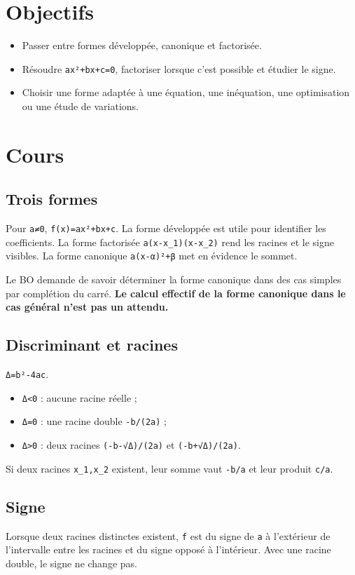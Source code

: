\section{Objectifs}
\begin{itemize}
\item Passer entre formes développée, canonique et factorisée.
\item Résoudre \texttt{ax²+bx+c=0}, factoriser lorsque c'est possible et étudier le signe.
\item Choisir une forme adaptée à une équation, une inéquation, une optimisation ou une étude de variations.
\end{itemize}

\section{Cours}
\subsection{Trois formes}
Pour \texttt{a≠0}, \texttt{f(x)=ax²+bx+c}. La forme développée est utile pour identifier les coefficients. La forme factorisée \texttt{a(x-x_1)(x-x_2)} rend les racines et le signe visibles. La forme canonique \texttt{a(x-α)²+β} met en évidence le sommet.

Le BO demande de savoir déterminer la forme canonique dans des cas simples par complétion du carré. \textbf{Le calcul effectif de la forme canonique dans le cas général n'est pas un attendu.}

\subsection{Discriminant et racines}
\texttt{Δ=b²-4ac}.
\begin{itemize}
\item \texttt{Δ<0} : aucune racine réelle ;
\item \texttt{Δ=0} : une racine double \texttt{-b/(2a)} ;
\item \texttt{Δ>0} : deux racines \texttt{(-b-√Δ)/(2a)} et \texttt{(-b+√Δ)/(2a)}.
\end{itemize}

Si deux racines \texttt{x_1,x_2} existent, leur somme vaut \texttt{-b/a} et leur produit \texttt{c/a}.

\subsection{Signe}
Lorsque deux racines distinctes existent, \texttt{f} est du signe de \texttt{a} à l'extérieur de l'intervalle entre les racines et du signe opposé à l'intérieur. Avec une racine double, le signe ne change pas.

